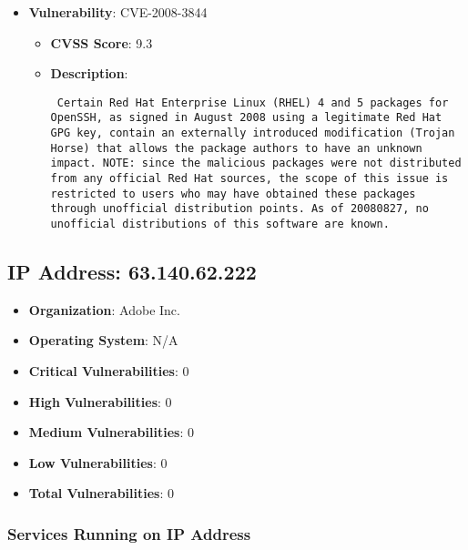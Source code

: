 \documentclass{article}
\begin{document}
\begin{itemize}
        \item \textbf{Vulnerability}: CVE-2008-3844
        \begin{itemize}
            \item \textbf{CVSS Score}:  9.3 
            \item \textbf{Description}: \parbox{\linewidth}{\texttt{ Certain Red Hat Enterprise Linux (RHEL) 4 and 5 packages for OpenSSH, as signed in August 2008 using a legitimate Red Hat GPG key, contain an externally introduced modification (Trojan Horse) that allows the package authors to have an unknown impact.  NOTE: since the malicious packages were not distributed from any official Red Hat sources, the scope of this issue is restricted to users who may have obtained these packages through unofficial distribution points.  As of 20080827, no unofficial distributions of this software are known. }}
        \end{itemize}
    
\end{itemize}


\clearpage



\subsection*{IP Address: 63.140.62.222}

\begin{itemize}
    \item \textbf{Organization}: Adobe Inc.
    \item \textbf{Operating System}:  N/A 
    \item \textbf{Critical Vulnerabilities}: 0
    \item \textbf{High Vulnerabilities}: 0
    \item \textbf{Medium Vulnerabilities}: 0
    \item \textbf{Low Vulnerabilities}: 0
    \item \textbf{Total Vulnerabilities}: 0
\end{itemize}

\subsubsection*{Services Running on IP Address}
\end{document}
